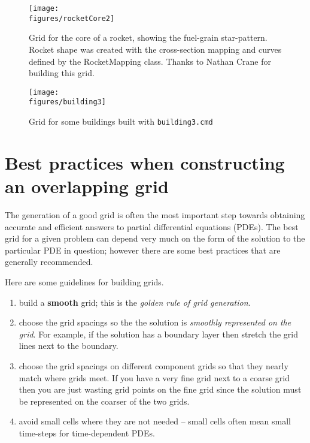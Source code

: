 \documentclass[xcolor=rgb,svgnames,dvipsnames]{article}
\newcommand{\figures}{\homeHenshaw/OvertureFigures}
\begin{document}
\begin{figure}[hbt]
\begin{center}
   \texttt{[image: \\figures/rocketCore2]}
  \caption{Grid for the core of a rocket, showing the fuel-grain star-pattern. Rocket shape was created
      with the cross-section mapping and curves defined by the RocketMapping class. Thanks to Nathan Crane
      for building this grid.}
\end{center}
\end{figure}

\begin{figure}[hbt]
\begin{center}
   \texttt{[image: \\figures/building3]}
  \caption{Grid for some buildings built with {\tt building3.cmd}}
\end{center}
\end{figure}


\clearpage
\section{Best practices when constructing an overlapping grid}


The generation of a good grid is often the most important step towards obtaining
accurate and efficient answers to partial differential equations (PDEs). The
best grid for a given problem can depend very much on the form of the solution
to the particular PDE in question; however there are some best practices that
are generally recommended.

\noindent Here are some guidelines for building grids.
\begin{enumerate}
  \item build a {\bf smooth} grid; this is the {\em golden rule of grid generation}.
  \item choose the grid spacings so the the solution is {\em smoothly
      represented on the grid}. For example, if the solution has a boundary
      layer then stretch the grid lines next to the boundary. 
  \item choose the grid spacings on different component grids so that they
     nearly match where grids meet. If you have a very fine grid next to a
     coarse grid then you are just wasting grid points on the fine grid since
     the solution must be represented on the coarser of the two grids.
  \item avoid small cells where they are not needed -- small cells often mean
  small time-steps for time-dependent PDEs.
\end{enumerate}
\end{document}
